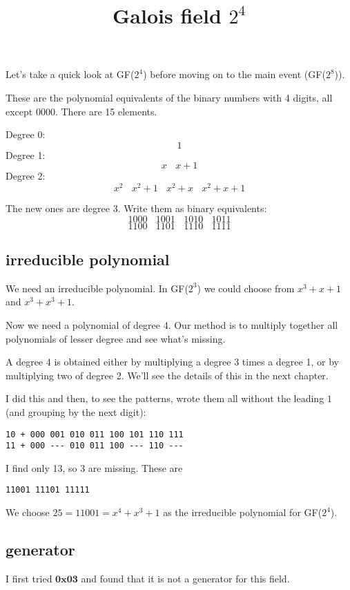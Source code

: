 \documentclass[11pt, oneside]{article}
\title{Galois field $2^4$}
\date{}
\begin{document}
\maketitle
\Large

Let's take a quick look at GF($2^4$) before moving on to the main event (GF($2^8$)).

These are the polynomial equivalents of the binary numbers with 4 digits, all except $0000$.  There are 15 elements.

Degree 0:
\[ 1 \]
Degree 1:
\[ x \ \ \ \ x + 1 \]
Degree 2:
\[ x^2 \ \ \ \ x^2 + 1 \ \ \ \ x^2 + x \ \ \ \ x^2 + x + 1 \]

The new ones are degree 3.  Write them as binary equivalents:
\[ 1000 \ \ \ \ 1001 \ \ \ \ 1010 \ \ \ \ 1011 \]
\[ 1100 \ \ \ \ 1101 \ \ \ \ 1110 \ \ \ \ 1111 \]

\subsection*{irreducible polynomial}
We need an irreducible polynomial.  In GF($2^3$) we could choose from $x^3 + x + 1$ and $x^3 + x^3 + 1$.

Now we need a polynomial of degree 4.  Our method is to multiply together all polynomials of lesser degree and see what's missing.

A degree 4 is obtained either by multiplying a degree 3 times a degree 1, or by multiplying two of degree 2.  We'll see the details of this in the next chapter.

I did this and then, to see the patterns, wrote them all without the leading $1$ (and grouping by the next digit):
\begin{verbatim}
10 + 000 001 010 011 100 101 110 111
11 + 000 --- 010 011 100 --- 110 ---
\end{verbatim}

I find only 13, so 3 are missing.  These are

\begin{verbatim}
11001 11101 11111
\end{verbatim}

We choose $25 = 11001 = x^4 + x^3 + 1$ as the irreducible polynomial for GF($2^4$).

\subsection*{generator}
I first tried $\textbf{0x03}$ and found that it is not a generator for this field.  
\end{document}

